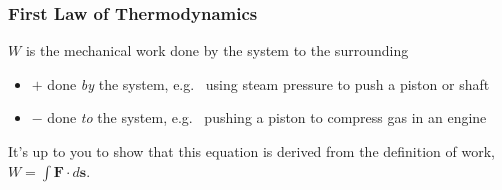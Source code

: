 \documentclass[12pt,aspectratio=169]{beamer}
\newcommand{\mb}[1]{\mathbf{#1}}
\newcommand{\eq}[2]{\vspace{#1}{\Large\begin{displaymath}#2\end{displaymath}}}
\begin{document}
\begin{frame}
  \frametitle{First Law of Thermodynamics}

  \vspace{-.1in}$W$ is the mechanical work done by the system to the surrounding
  \begin{itemize}
  \item $+$ done \emph{by} the system, e.g.\
    using steam pressure to push a piston or shaft
  \item $-$ done \emph{to} the system, e.g.\
    pushing a piston to compress gas in an engine
  \end{itemize}
%
%
%

  \eq{-.2in}{
    \boxed{ W=\int_{P_1}^{P_2} PdV}
  }
  
  \vspace{-.1in}It's up to you to show that this equation is derived from the
  definition of work, $W=\int\mb{F}\cdot d\mb{s}$.
\end{frame}
\end{document}
